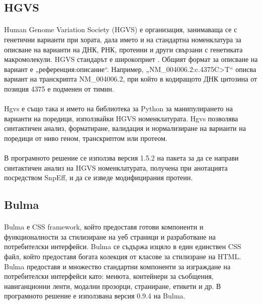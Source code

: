 \documentclass[pdftex,cyrillic,14pt,a4page,twoside,openright]{extreport}
\begin{document}
\subsection{HGVS}\label{sec:hgvs}
\paragraph{}
Human Genome Variation Society (HGVS) е организация, занимаваща се с генетични варианти при хората, дала името и на стандартна номенклатура за описване на варианти на ДНК, РНК, протеини и други свързани с генетиката макромолекули. HGVS стандарът е широкоприет \cite{dunnen2016}. Общият формат за описване на вариант е „референция:описание“. Например, „NM\_004006.2:c.4375C>T“ описва вариант на транскрипта NM\_004006.2, при който в кодиращото ДНК цитозина от позиция 4375 е подменен от тимин.

\paragraph{}
Hgvs \cite{wang2018} е също така и името на библиотека за Python за манипулирането на варианти на поредици, използвайки HGVS номенклатурата. Hgvs позволява синтактичен анализ, форматиране, валидация и нормализиране на варианти на поредици от ниво геном, транскриптом или протеом.

\paragraph{}
В програмното решение се използва версия 1.5.2 на пакета за да се направи синтактичен анализ на HGVS номенклатурата, получена при анотацията посредством SnpEff, и да се изведе модифицирания протеин.

\subsection{Bulma}
\paragraph{}
Bulma е CSS framework, който предоставя готови компоненти и функционалности за стилизиране на уеб страници и разработване на потребителски интерфейси. Bulma се съдържа изцяло в един единствен CSS файл, който предоставя богата колекция от класове за стилизране на HTML. Bulma предоставя и множество стандартни компоненти за изграждане на потребителски интерфейси като: менюта, контейнери за съобщения, навиганционни ленти, модални прозорци, страниране, етикети и др. В програмното решение е използвана версия 0.9.4 на Bulma.
\end{document}
